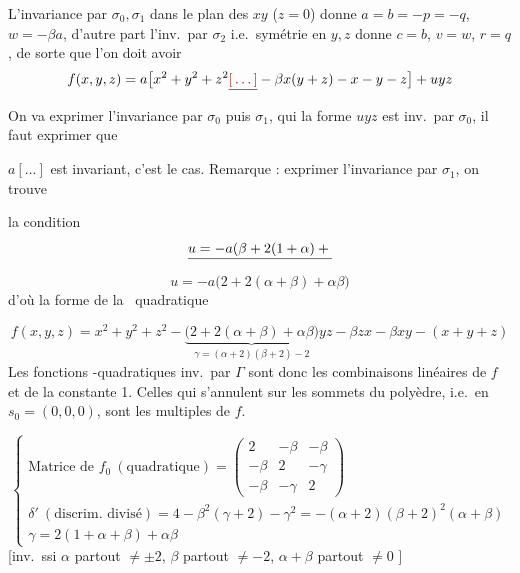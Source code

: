 \documentclass[11pt,a4paper]{article}
\begin{document}
L'invariance par $\sigma_0, \sigma_1$ dans le plan des $xy$ ($z = 0$) donne $a = b = -p = -q$, $w = -\beta a$, d'autre part l'inv.\ par $\sigma_2$ i.e.\ symétrie en $y, z$ donne $c = b$, $v = w$, $r = q$, de sorte que l'on doit avoir
\[
f(x,y,z) = a\bigl[x^2 + y^2 + z^2 \struck{\ill{}} - \beta x(y+z) - x - y - z\bigr] + uyz
\]
On va exprimer l'invariance par $\sigma_0$ puis $\sigma_1$, \ill{} qui  la forme $uyz$ est inv.\ par $\sigma_0$,  il faut  exprimer que

$a[\dots]$ est invariant, c'est le cas. Remarque : 
 exprimer l'invariance par $\sigma_1$, on trouve 

la condition 
\[
\struck{u = -a(\beta + 2(1+\alpha) + {}}
\]
\[
u = -a\bigl(2 + 2(\alpha+\beta) + \alpha\beta\bigr)
\]
d'où la forme de la  \ quadratique 

\[
f(x,y,z) = x^2 + y^2 + z^2 - \underbrace{\bigl(2 + 2(\alpha+\beta) + \alpha\beta\bigr)}_{\gamma = (\alpha+2)(\beta+2) - 2} yz - \beta zx - \beta xy - (x+y+z)
\]
Les fonctions -quadratiques inv.\ par $\Gamma$ sont donc les combinaisons linéaires de $f$ et de la constante 1. Celles qui s'annulent sur les sommets du polyèdre, i.e.\ en $s_0 = (0,0,0)$, sont les multiples de $f$.

\[
\begin{cases}
\text{Matrice de } f_0 \ (\text{quadratique}) = \begin{pmatrix} 2 & -\beta & -\beta \\ -\beta & 2 & -\gamma \\ -\beta & -\gamma & 2 \end{pmatrix} \\[4ex]
\delta'\ (\text{discrim.\ divisé}) = 4 - \beta^2(\gamma+2) - \gamma^2 = -(\alpha+2)(\beta+2)^2(\alpha+\beta) \\[1ex]
\gamma = 2(1+\alpha+\beta) + \alpha\beta
\end{cases}
\]
[inv.\ ssi $\alpha$ partout $\neq \pm 2$, $\beta$ partout $\neq -2$, $\alpha+\beta$ partout $\neq 0$ ]
\end{document}

